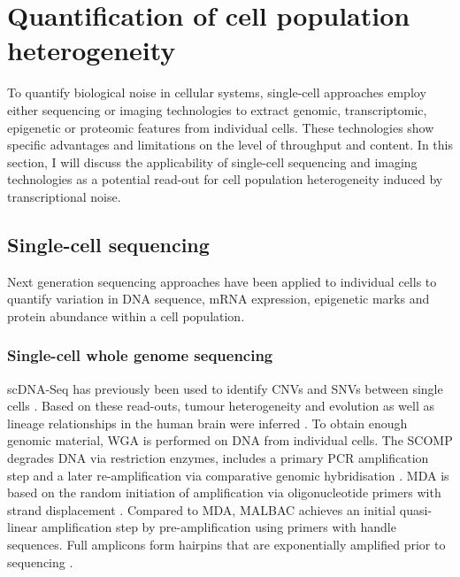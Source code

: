 
\section{Quantification of cell population heterogeneity} 

To quantify biological noise in cellular systems, single-cell approaches employ either sequencing or imaging technologies to extract genomic, transcriptomic, epigenetic or proteomic features from individual cells. These technologies show specific advantages and limitations on the level of throughput and content. 
In this section, I will discuss the applicability of single-cell sequencing and imaging technologies as a potential read-out for cell population heterogeneity induced by transcriptional noise.

\subsection{Single-cell sequencing}

Next generation sequencing approaches have been applied to individual cells to quantify variation in DNA sequence, mRNA expression, epigenetic marks and protein abundance within a cell population. 

\subsubsection{Single-cell whole genome sequencing}

\Gls{scDNA-Seq} has previously been used to identify CNVs and SNVs between single cells \citep{Shpunt2012}. 
Based on these read-outs, tumour heterogeneity and evolution \citep{Navin2011} as well as lineage relationships in the human brain were inferred \citep{Evrony2015}. 
To obtain enough genomic material, \gls{WGA} is performed on DNA from individual cells. The \gls{SCOMP} degrades DNA via restriction enzymes, includes a primary \gls{PCR} amplification step and a later re-amplification via comparative genomic hybridisation \citep{Klein1999}. \Gls{MDA} is based on the random initiation of amplification via oligonucleotide primers with strand displacement \citep{Dean2002}. Compared to MDA, \gls{MALBAC} achieves an initial quasi-linear amplification step by pre-amplification using primers with handle sequences. 
Full amplicons form hairpins that are exponentially amplified prior to sequencing \citep{Shpunt2012}. \\

